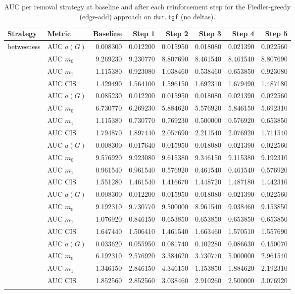 \begin{table}[htbp]
  \centering
  \caption{AUC per removal strategy at baseline and after each reinforcement step for the Fiedler-greedy (edge-add) approach on \texttt{dur.tgf} (no deltas).}
  \label{tab:dur-fiedler_greedy-auc}
  \begin{tabular}{llrrrrrr}
    \toprule
    \textbf{Strategy} & \textbf{Metric} & \textbf{Baseline} & \textbf{Step 1} & \textbf{Step 2} & \textbf{Step 3} & \textbf{Step 4} & \textbf{Step 5} \\
    \midrule
    \multirow{4}{*}{betweeness} & AUC $a(G)$ & 0.008300 & 0.012200 & 0.015950 & 0.018080 & 0.021390 & 0.022560 \\
    & AUC $m_0$ & 9.269230 & 9.230770 & 8.807690 & 8.461540 & 8.461540 & 8.807690 \\
    & AUC $m_1$ & 1.115380 & 0.923080 & 1.038460 & 0.538460 & 0.653850 & 0.923080 \\
    & AUC CIS & 1.429490 & 1.564100 & 1.596150 & 1.692310 & 1.679490 & 1.487180 \\
    \addlinespace
    \multirow{4}{*}{closeness} & AUC $a(G)$ & 0.085230 & 0.012200 & 0.015950 & 0.018080 & 0.021390 & 0.022560 \\
    & AUC $m_0$ & 6.730770 & 6.269230 & 5.884620 & 5.576920 & 5.846150 & 5.692310 \\
    & AUC $m_1$ & 1.115380 & 0.730770 & 0.769230 & 0.500000 & 0.576920 & 0.653850 \\
    & AUC CIS & 1.794870 & 1.897440 & 2.057690 & 2.211540 & 2.076920 & 1.711540 \\
    \addlinespace
    \multirow{4}{*}{core influence} & AUC $a(G)$ & 0.008300 & 0.017640 & 0.015950 & 0.018080 & 0.021390 & 0.022560 \\
    & AUC $m_0$ & 9.576920 & 9.923080 & 9.615380 & 9.346150 & 9.115380 & 9.192310 \\
    & AUC $m_1$ & 0.961540 & 0.961540 & 0.576920 & 0.461540 & 0.461540 & 0.576920 \\
    & AUC CIS & 1.551280 & 1.461540 & 1.416670 & 1.448720 & 1.487180 & 1.442310 \\
    \addlinespace
    \multirow{4}{*}{degree} & AUC $a(G)$ & 0.008300 & 0.012200 & 0.015950 & 0.018080 & 0.021390 & 0.022560 \\
    & AUC $m_0$ & 9.192310 & 9.730770 & 9.500000 & 8.961540 & 9.038460 & 9.153850 \\
    & AUC $m_1$ & 1.076920 & 0.846150 & 0.653850 & 0.653850 & 0.653850 & 0.653850 \\
    & AUC CIS & 1.647440 & 1.506410 & 1.461540 & 1.663460 & 1.570510 & 1.557690 \\
    \addlinespace
    \multirow{4}{*}{random} & AUC $a(G)$ & 0.033620 & 0.055950 & 0.081740 & 0.102280 & 0.086630 & 0.150070 \\
    & AUC $m_0$ & 6.192310 & 2.576920 & 3.384620 & 3.730770 & 5.000000 & 2.961540 \\
    & AUC $m_1$ & 1.346150 & 2.846150 & 4.346150 & 1.153850 & 1.884620 & 2.192310 \\
    & AUC CIS & 1.852560 & 2.852560 & 3.038460 & 2.910260 & 2.500000 & 3.076920 \\
    \addlinespace
    \bottomrule
  \end{tabular}
\end{table}
